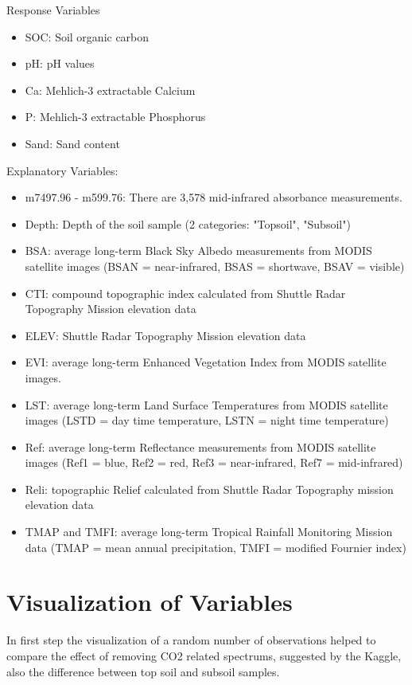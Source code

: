 \documentclass[12pt,letterpaper]{article}
\begin{document}
\noindent Response Variables
\begin{itemize}
	\item SOC: Soil organic carbon
	\item pH: pH values
	\item Ca: Mehlich-3 extractable Calcium
	\item P: Mehlich-3 extractable Phosphorus
	\item Sand: Sand content
\end{itemize}

Explanatory Variables:
\begin{itemize}
	\item m7497.96 - m599.76: There are 3,578 mid-infrared absorbance measurements. 
	\item Depth: Depth of the soil sample (2 categories: "Topsoil", "Subsoil")
	\item BSA: average long-term Black Sky Albedo measurements from MODIS satellite images (BSAN = near-infrared, BSAS = shortwave, BSAV = visible)
	\item CTI: compound topographic index calculated from Shuttle Radar Topography Mission elevation data
	\item ELEV: Shuttle Radar Topography Mission elevation data
	\item EVI: average long-term Enhanced Vegetation Index from MODIS satellite images.
	\item LST: average long-term Land Surface Temperatures from MODIS satellite images (LSTD = day time temperature, LSTN = night time temperature)
	\item Ref: average long-term Reflectance measurements from MODIS satellite images (Ref1 = blue, Ref2 = red, Ref3 = near-infrared, Ref7 = mid-infrared)
	\item Reli: topographic Relief calculated from Shuttle Radar Topography mission elevation data
	\item TMAP and TMFI: average long-term Tropical Rainfall Monitoring Mission data (TMAP = mean annual precipitation, TMFI = modified Fournier index)
\end{itemize}

\section{Visualization of Variables}

In first step the visualization of a random number of observations helped to compare the effect of removing CO2 related spectrums, suggested by the Kaggle, also the difference between top soil and subsoil samples.
\end{document}
